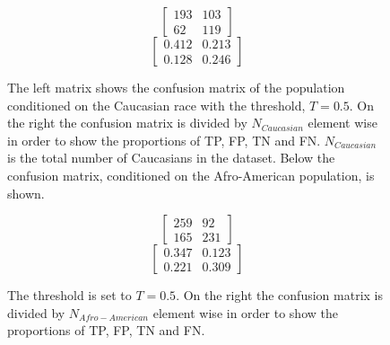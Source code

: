 \documentclass[11pt, fleqn, titlepage]{article}
\begin{document}
	\begin{figure}[h]	
	\begin{multicols}{2}
		\begin{ceqn}
		\begin{equation*}
		\begin{bmatrix}
		193 & 103  \\
		62 & 119 
		\end{bmatrix} 
		\end{equation*} 
		\begin{equation*}
		\begin{bmatrix}
		0.412 & 0.213  \\
		0.128 & 0.246 
		\end{bmatrix} 
		\end{equation*}
		\end{ceqn}
	\end{multicols}
	{The left matrix shows the confusion matrix of the population conditioned on the Caucasian race with the threshold, $ T = 0.5 $. On the right the confusion matrix is divided by $ N_{Caucasian} $ element wise in order to show the proportions of TP, FP, TN and FN. $ N_{Caucasian} $ is the total number of Caucasians in the dataset. Below the confusion matrix, conditioned on the Afro-American population, is shown.}
	\end{figure}
	\begin{figure}[h]	
		\begin{multicols}{2}
			\begin{ceqn}
			\begin{equation*}
			\begin{bmatrix}
			259 & 92  \\
			165 & 231 
			\end{bmatrix} 
			\end{equation*} 
			\begin{equation*}
			\begin{bmatrix}
			0.347 & 0.123 \\
			0.221 & 0.309 
			\end{bmatrix} 
			\end{equation*}
			\end{ceqn}
		\end{multicols}
		{The threshold is set to $ T = 0.5 $. On the right the confusion matrix is divided by $ N_{Afro-American} $ element wise in order to show the proportions of TP, FP, TN and FN.}
	\end{figure}
	
\end{document}
